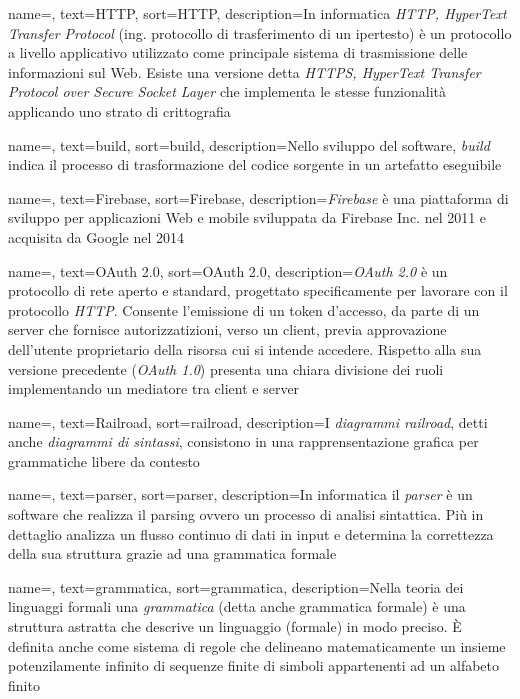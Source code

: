 {
	name=,
	text=HTTP,
	sort=HTTP,
	description={In informatica \emph{HTTP, HyperText Transfer Protocol} (ing. protocollo di trasferimento di un ipertesto) è un protocollo a livello applicativo utilizzato come principale sistema di trasmissione delle informazioni sul Web. Esiste una versione detta \emph{HTTPS, HyperText Transfer Protocol over Secure Socket Layer} che implementa le stesse funzionalità applicando uno strato di crittografia}
}

{
	name=,
	text=build,
	sort=build,
	description={Nello sviluppo del software, \emph{build} indica il processo di trasformazione del codice sorgente in un artefatto eseguibile}
}

{
	name=,
	text=Firebase,
	sort=Firebase,
	description={\emph{Firebase} è una piattaforma di sviluppo per applicazioni Web e mobile sviluppata da Firebase Inc. nel 2011 e acquisita da Google nel 2014}
}

{
	name=,
	text=OAuth 2.0,
	sort=OAuth 2.0,
	description={\emph{OAuth 2.0} è un protocollo di rete aperto e standard, progettato specificamente per lavorare con il protocollo \emph{HTTP}. Consente l'emissione di un token d'accesso, da parte di un server che fornisce autorizzatizioni, verso un client, previa approvazione dell'utente proprietario della risorsa cui si intende accedere. Rispetto alla sua versione precedente (\emph{OAuth 1.0}) presenta una chiara divisione dei ruoli implementando un mediatore tra client e server}
}

{
	name=,
	text=Railroad,
	sort=railroad,
	description={I \emph{diagrammi railroad}, detti anche \emph{diagrammi di sintassi}, consistono in una rapprensentazione grafica per grammatiche libere da contesto}
}

{
	name=,
	text=parser,
	sort=parser,
	description={In informatica il \emph{parser} è un software che realizza il parsing ovvero un processo di analisi sintattica. Più in dettaglio analizza un flusso continuo di dati in input e determina la correttezza della sua struttura grazie ad una grammatica formale}
}

{
	name=,
	text=grammatica,
	sort=grammatica,
	description={Nella teoria dei linguaggi formali una \emph{grammatica} (detta anche grammatica formale) è una struttura astratta che descrive un linguaggio (formale) in modo preciso. È definita anche come sistema di regole che delineano matematicamente un insieme potenzilamente infinito di sequenze finite di simboli appartenenti ad un alfabeto finito}
}


